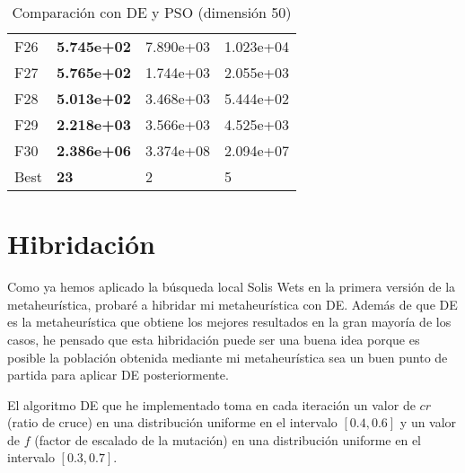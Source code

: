 \documentclass[10pt,a4paper]{article}
\begin{document}
\begin{table}[]
\begin{tabular}{|l|l|l|l|}
		F26  &  \textbf{5.745e+02} &  7.890e+03 &  1.023e+04 \\
		F27  &  \textbf{5.765e+02} &  1.744e+03 &  2.055e+03 \\
		F28  &  \textbf{5.013e+02} &  3.468e+03 &  5.444e+02 \\
		F29  &  \textbf{2.218e+03} &  3.566e+03 &  4.525e+03 \\
		F30  &  \textbf{2.386e+06} &  3.374e+08 &  2.094e+07 \\ \hline
		Best &         \textbf{23} &          2 &          5 \\ \hline
	\end{tabular}
	\caption{Comparación con DE y PSO (dimensión 50)}
	\label{table:mimh1_dim50}
\end{table}
















\newpage

\section{Hibridación}

Como ya hemos aplicado la búsqueda local Solis Wets en la primera versión de la metaheurística, probaré a hibridar mi metaheurística con DE. Además de que DE es la metaheurística que obtiene los mejores resultados en la gran mayoría de los casos, he pensado que esta hibridación puede ser una buena idea porque es posible la población obtenida mediante mi metaheurística sea un buen punto de partida para aplicar DE posteriormente.

El algoritmo DE que he implementado toma en cada iteración un valor de $cr$ (ratio de cruce) en una distribución uniforme en el intervalo $[0.4,0.6]$ y un valor de $f$ (factor de escalado de la mutación) en una distribución uniforme en el intervalo $[0.3,0.7]$.
\end{document}

